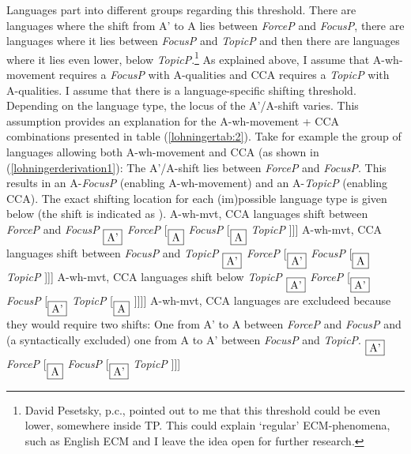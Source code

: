 \documentclass[output=paper,colorlinks,citecolor=brown]{langscibook}
\begin{document}
\noindent Languages part into different groups regarding this threshold. There are languages where the shift from A' to A lies between \emph{ForceP} and \emph{FocusP}, there are languages where it lies between \emph{FocusP} and \emph{TopicP} and then there are languages where it lies even lower, below \emph{TopicP}.\footnote{David Pesetsky, p.c., pointed out to me that this threshold could be even lower, somewhere inside TP. This could explain ‘regular' ECM-phenomena, such as English ECM and I leave the idea open for further research.} As explained above, I assume that A-wh-movement requires a \emph{FocusP} with A-qualities and CCA requires a \emph{TopicP} with A-qualities. I assume that there is a language-specific shifting threshold. Depending on the language type, the locus of the A'/A-shift varies. This assumption provides an explanation for the A-wh-movement + CCA combinations presented in table (\ref{lohningertab:2}). Take for example the group of languages allowing both A-wh-movement and CCA (as shown in (\ref{lohningerderivation1}): The A'/A-shift lies between \emph{ForceP} and \emph{FocusP}. This results in an A-\emph{FocusP} (enabling A-wh-movement) and an A-\emph{TopicP} (enabling CCA). The exact shifting location for each (im)possible language type is given below (the shift is indicated as \rightarrow).
\ea\label{lohningerderivation1}
\ea \cmark A-wh-mvt, \cmark CCA languages shift between \emph{ForceP} and \emph{FocusP}
\ex {[}$_{\fbox{A'}}$ \emph{ForceP} \rightarrow [$_{\fbox{A}}$  \emph{FocusP} [$_{\fbox{A}}$  \emph{TopicP} {]]]}
\z\z 
\ea
\ea \xmark A-wh-mvt, \cmark CCA languages shift between \emph{FocusP} and \emph{TopicP}
\ex {[}$_{\fbox{A'}}$ \emph{ForceP}  [$_{\fbox{A'}}$  \emph{FocusP} \rightarrow [$_{\fbox{A}}$  \emph{TopicP} {]]]}
\z\z 
\ea
\ea \xmark A-wh-mvt, \xmark CCA languages shift below \emph{TopicP}
\ex {[}$_{\fbox{A'}}$ \emph{ForceP} [$_{\fbox{A'}}$  \emph{FocusP} [$_{\fbox{A'}}$  \emph{TopicP}  \rightarrow [$_{\fbox{A}}$ {]]]]}
\z\z 
\ea
\ea \cmark A-wh-mvt, \xmark CCA languages are excludeed because they would require two shifts: One from A' to A between \emph{ForceP} and \emph{FocusP} and (a syntactically excluded) one from A to A' between \emph{FocusP} and \emph{TopicP}.
\ex * {[}$_{\fbox{A'}}$ \emph{ForceP} \rightarrow [$_{\fbox{A}}$  \emph{FocusP} \rightarrow [$_{\fbox{A'}}$  \emph{TopicP} {]]]}
\z\z 
\end{document}
